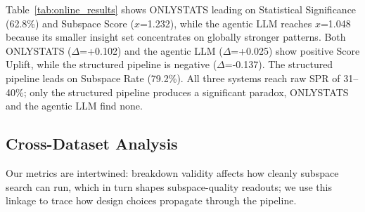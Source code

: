 \documentclass[conference]{IEEEtran}
\begin{document}
{
\renewcommand{\arraystretch}{0.88}
\setlength{\abovecaptionskip}{0pt}
\setlength{\belowcaptionskip}{-4pt}
\begin{table}[!ht]
\caption{Results on Online Sales (QUIS-Style=106, Agentic=61, ONLY=114)}
\centering
{}
\label{tab:online_results}
\vspace{-3pt}
\end{table}
}

Table~\ref{tab:online_results} shows ONLYSTATS leading on Statistical Significance (62.8\%) and Subspace Score ($x$=1.232), while the agentic LLM reaches $x$=1.048 because its smaller insight set concentrates on globally stronger patterns. Both ONLYSTATS ($\Delta$=+0.102) and the agentic LLM ($\Delta$=+0.025) show positive Score Uplift, while the structured pipeline is negative ($\Delta$=-0.137). The structured pipeline leads on Subspace Rate (79.2\%). All three systems reach raw SPR of 31--40\%; only the structured pipeline produces a significant paradox, ONLYSTATS and the agentic LLM find none.

\subsection{Cross-Dataset Analysis}

Our metrics are intertwined: breakdown validity affects how cleanly subspace search can run, which in turn shapes subspace-quality readouts; we use this linkage to trace how design choices propagate through the pipeline.
\end{document}
